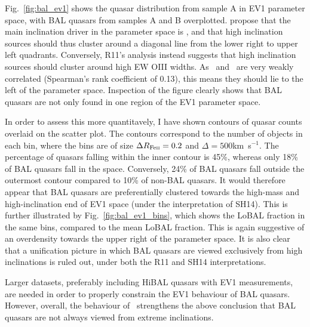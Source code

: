 Fig.~\ref{fig:bal_ev1} shows the quasar distribution from sample A 
in EV1 parameter space, with BAL quasars from samples A and B overplotted.
\cite[][hereafter SH14]{shenho2014} propose 
that the main inclination driver in the parameter space
is \fwh, and that high inclination sources should thus cluster around
a diagonal line from the lower right to upper left quadrants. Conversely,
R11's analysis instead suggests that high inclination sources should cluster
around high EW OIII widths. As \ewo\ and \fwh\ are very weakly correlated
(Spearman's rank coefficient of 0.13), this means they should lie to
the left of the parameter space. Inspection of the figure clearly 
shows that BAL quasars are not only found in one region of the 
EV1 parameter space. 

In order to assess this more quantitavely, I have shown contours of 
quasar counts overlaid on the scatter plot. The contours correspond
to the number of objects in each bin, where the bins are of size
$\Delta R_{{\rm Fe \textsc{ii}}} = 0.2$ and $\Delta$\fwh$=500$km~s$^{-1}$.
The percentage of quasars falling within the inner contour is 45\%, 
whereas only 18\% of BAL quasars fall in the space. Conversely, 24\% 
of BAL quasars fall outside the outermost contour compared to 10\% of 
non-BAL quasars. It would therefore appear that BAL 
quasars are preferentially clustered towards the high-mass and 
high-inclination end of EV1 space (under the interpretation of SH14).
This is further illustrated by Fig.~\ref{fig:bal_ev1_bins},
which shows the LoBAL fraction in the same bins, compared to the 
mean LoBAL fraction. This is again suggestive of an overdensity 
towards the upper right of the parameter space.
It is also clear that a unification picture in which BAL 
quasars are viewed exclusively from high inclinations is ruled out,
under both the R11 and SH14 interpretations. 

Larger datasets, preferably including HiBAL quasars with EV1 measurements, 
are needed in order to properly constrain the EV1 behaviour of BAL quasars.
However, overall, the behaviour of \fwh\ strengthens the above 
conclusion that BAL quasars are not always viewed from 
extreme inclinations.


